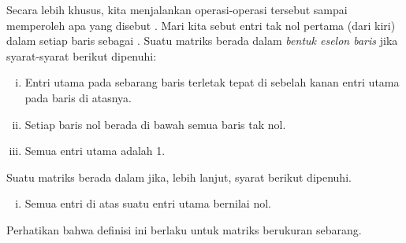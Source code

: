 Secara lebih khusus, kita menjalankan operasi-operasi tersebut sampai memperoleh apa yang disebut
\emph{}.
Mari kita sebut
entri tak nol pertama (dari kiri) dalam setiap baris sebagai
\emph{}.
Suatu matriks berada dalam \emph{bentuk eselon baris} jika
syarat-syarat berikut dipenuhi:
\begin{enumerate}[(i)]
\item Entri utama pada sebarang baris terletak tepat di sebelah kanan
entri utama pada baris di atasnya.
\item Setiap baris nol berada di bawah semua baris tak nol.
\item Semua entri utama adalah 1.
\end{enumerate}
Suatu matriks berada dalam \emph{}
jika, lebih lanjut, syarat berikut dipenuhi.
\begin{enumerate}[(i),resume]
\item Semua entri di atas suatu entri utama bernilai nol.
\end{enumerate}

Perhatikan bahwa definisi ini berlaku untuk matriks berukuran sebarang.

